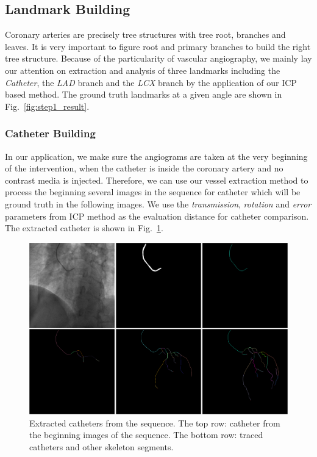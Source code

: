 \documentclass[journal]{IEEEtran}
\begin{document}
\subsection{Landmark Building}
Coronary arteries are precisely tree structures with tree root, branches and leaves. It is very important to figure root and primary branches to build the right tree structure. Because of the particularity of vascular angiography, we mainly lay our attention on extraction and analysis of three landmarks including the \textit{Catheter}, the \textit{LAD} branch and the \textit{LCX} branch by the application of our ICP based method. The ground truth landmarks at a given angle are shown in Fig.~\ref{fig:step1_result}.

\subsubsection{\textbf{Catheter Building}}
In our application, we make sure the angiograms are taken at the very beginning of the intervention, when the catheter is inside the coronary artery and no contrast media is injected. Therefore, we can use our vessel extraction method to process the beginning several images in the sequence for catheter which will be ground truth in the following images. We use the \textit{transmission}, \textit{rotation} and \textit{error} parameters from ICP method as the evaluation distance for catheter comparison. The extracted catheter is shown in Fig.~\ref{fig:catheter_building}.

\begin{figure}[!t]
\centering
\includegraphics[width=1.0\linewidth]{./images/catheter_building.png}
\caption{Extracted catheters from the sequence. The top row: catheter from the beginning images of the sequence. The bottom row: traced catheters and other skeleton segments.}
\label{fig:catheter_building}
\end{figure}
\end{document}
